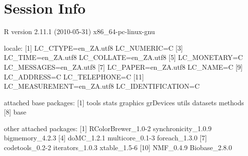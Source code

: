 \documentclass[a4paper]{article}
\begin{document}
\section{Session Info}
\begin{Schunk}
\begin{Soutput}
R version 2.11.1 (2010-05-31) 
x86_64-pc-linux-gnu 

locale:
 [1] LC_CTYPE=en_ZA.utf8       LC_NUMERIC=C             
 [3] LC_TIME=en_ZA.utf8        LC_COLLATE=en_ZA.utf8    
 [5] LC_MONETARY=C             LC_MESSAGES=en_ZA.utf8   
 [7] LC_PAPER=en_ZA.utf8       LC_NAME=C                
 [9] LC_ADDRESS=C              LC_TELEPHONE=C           
[11] LC_MEASUREMENT=en_ZA.utf8 LC_IDENTIFICATION=C      

attached base packages:
[1] tools     stats     graphics  grDevices utils     datasets  methods  
[8] base     

other attached packages:
 [1] RColorBrewer_1.0-2  synchronicity_1.0.9 bigmemory_4.2.3    
 [4] doMC_1.2.1          multicore_0.1-3     foreach_1.3.0      
 [7] codetools_0.2-2     iterators_1.0.3     xtable_1.5-6       
[10] NMF_0.4.9           Biobase_2.8.0      
\end{Soutput}
\end{Schunk}
\end{document}
